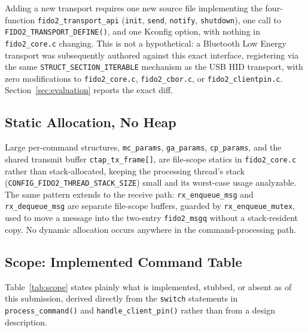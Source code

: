 Adding a new transport requires one new source file implementing the four-function \texttt{fido2\_transport\_api} (\texttt{init}, \texttt{send}, \texttt{notify}, \texttt{shutdown}), one call to \texttt{FIDO2\_TRANSPORT\_DEFINE()}, and one Kconfig option, with nothing in \texttt{fido2\_core.c} changing. This is not a hypothetical: a Bluetooth Low Energy transport was subsequently authored against this exact interface, registering via the same \texttt{STRUCT\_SECTION\_ITERABLE} mechanism as the USB HID transport, with zero modifications to \texttt{fido2\_core.c}, \texttt{fido2\_cbor.c}, or \texttt{fido2\_clientpin.c}. Section~\ref{sec:evaluation} reports the exact diff.

\subsection{Static Allocation, No Heap}
\label{subsec:arch-static}

Large per-command structures, \texttt{mc\_params}, \texttt{ga\_params}, \texttt{cp\_params}, and the shared transmit buffer \texttt{ctap\_tx\_frame[]}, are file-scope statics in \texttt{fido2\_core.c} rather than stack-allocated, keeping the processing thread's stack (\texttt{CONFIG\_FIDO2\_THREAD\_STACK\_SIZE}) small and its worst-case usage analyzable. The same pattern extends to the receive path: \texttt{rx\_enqueue\_msg} and \texttt{rx\_dequeue\_msg} are separate file-scope buffers, guarded by \texttt{rx\_enqueue\_mutex}, used to move a message into the two-entry \texttt{fido2\_msgq} without a stack-resident copy. No dynamic allocation occurs anywhere in the command-processing path.

\subsection{Scope: Implemented Command Table}
\label{subsec:arch-scope}

Table~\ref{tab:scope} states plainly what is implemented, stubbed, or absent as of this submission, derived directly from the \texttt{switch} statements in \texttt{process\_command()} and \texttt{handle\_client\_pin()} rather than from a design description.

